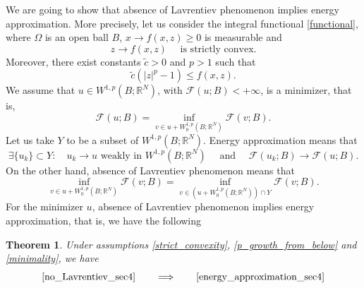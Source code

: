 \documentclass[a4paper,10pt]{article}
\theoremstyle{plain}
\newtheorem{thm}{Theorem}[section]
\theoremstyle{definition}
\numberwithin{equation}{section} \makeatletter
\begin{document}
\noindent
We are going to show that absence of Lavrentiev phenomenon implies energy approximation. More precisely, 
 let us consider the integral functional \eqref{functional}, where
 $\Omega$ is an open ball $B$, 
 $x \to f(x,z) \geq 0$ is measurable and
 \begin{equation}
     \label{strict_convexity}
     z \to f(x,z) \quad \text{ is strictly convex.}
 \end{equation}
 Moreover, there exist constants $\tilde{c} > 0$ and $p>1$ such that
 \begin{equation}
     \label{p_growth_from_below}
    \tilde{c} (|z|^p - 1) \leq f(x,z).
 \end{equation}
We assume that $u \in W^{1,p}(B;\mathbb{R}^N)$, with $\mathcal{F}(u;B) < +\infty$, is a minimizer, that is,
\begin{equation}
     \label{minimality}
    \mathcal{F}(u;B) = \inf_{v \in u + W^{1,p}_0(B;\mathbb{R}^N)} \mathcal{F}(v;B).
 \end{equation}
Let us take $Y$ to be a subset of  $W^{1,p}(B;\mathbb{R}^N)$. Energy approximation means that
\begin{equation}
    \label{energy_approximation_sec4}
    \exists \{u_k\} \subset Y: \quad u_k \to u \text{ weakly in } W^{1,p}(B;\mathbb{R}^N) \quad \text{ and } \quad \mathcal{F}(u_k;B) \to \mathcal{F}(u;B).
\end{equation}
On the other hand, absence of Lavrentiev phenomenon means that
\begin{equation}
    \label{no_Lavrentiev_sec4}
    \inf_{v \in u + W^{1,p}_0(B;\mathbb{R}^N)} \mathcal{F}(v;B) =
    \inf_{v \in (u + W^{1,p}_0(B;\mathbb{R}^N)) \cap Y} \mathcal{F}(v;B).
\end{equation}
For the minimizer $u$, absence of Lavrentiev phenomenon implies energy approximation, that is, we have the following 
\begin{thm}
\label{absence_of_Lavrentiev} 
Under assumptions \eqref{strict_convexity}, \eqref{p_growth_from_below} and \eqref{minimality}, we have
\begin{equation}
    \label{no_Lav_implies_en_approx}
    \eqref{no_Lavrentiev_sec4}
    \qquad
    \Longrightarrow
    \qquad\eqref{energy_approximation_sec4}
\end{equation}
\end{thm}
\end{document}
